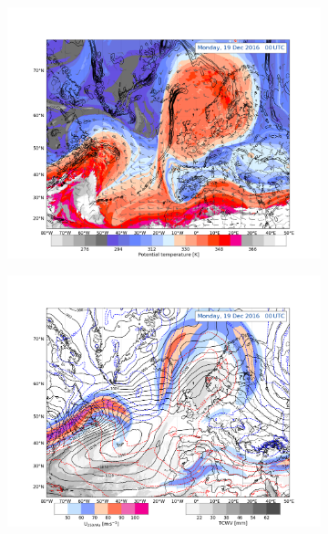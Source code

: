 \begin{figure}[!t]
	\centering
	\begin{subfigure}[b]{0.49\textwidth}
		\includegraphics[trim={4.2cm 0cm 4.3cm 5.1cm},clip,
		width=\textwidth]{./fig_DynTropo/20161219_00}
		\caption{} \label{fig:DT19_00}
	\end{subfigure}
	\begin{subfigure}[b]{0.49\textwidth}
		\includegraphics[trim={4.2cm 0cm 4.3cm 5.1cm},clip,
		width=\textwidth]{./fig_Geopot_Jet/20161219_00}
		\caption{} \label{fig:GP19_00}
	\end{subfigure}

\end{figure}

